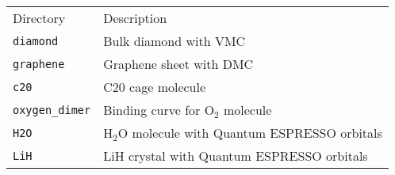 \begin{tabular}{l l}
Directory  & Description \\
\texttt{diamond} &  Bulk diamond with VMC \\
\texttt{graphene} & Graphene sheet with DMC \\
\texttt{c20} & C20 cage molecule \\
\texttt{oxygen\_dimer} & Binding curve for O$_2$ molecule \\
\texttt{H2O} & H$_2$O molecule with Quantum ESPRESSO orbitals \\
\texttt{LiH} & LiH crystal with Quantum ESPRESSO orbitals \\
\end{tabular}









%

